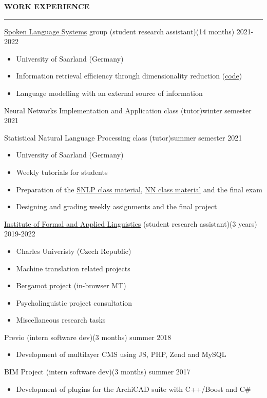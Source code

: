 \documentclass[11pt,a4paper]{article} %
\newcommand{\hSection}[1]{
    \medskip
    \MakeUppercase{\bf #1}
    \medskip
    \hrule
}
\newcommand{\hSubsection}[2]{{#1}\hfill {#2}}
\newcommand{\hSubsectionItemize}[3]{
    {#1}\hfill {\footnotesize #2}\hspace{-1cm}\\
    \vspace{-0.5cm}
    \begin{itemize} \footnotesize #3 \end{itemize}
    \vspace{0.3\baselineskip}
}
\begin{document}
\newpage

\vspace{-0.1cm}
\hSection{Work Experience}
\hSubsectionItemize
{\href{https://www.lsv.uni-saarland.de/}{Spoken Language Systems} group (student research assistant)}
{(14 months) 2021-2022}
{
    \item University of Saarland (Germany)
    \item Information retrieval efficiency through dimensionality reduction (\href{https://github.com/zouharvi/kb-shrink}{code})
    \item Language modelling with an external source of information
}

\hSubsection{Neural Networks Implementation and Application class (tutor)}{\footnotesize winter semester 2021 \hspace{-1.3cm}}
\vspace{-0.2cm}

\hSubsectionItemize
{Statistical Natural Language Processing class (tutor)}
{summer semester 2021}
{
    \item University of Saarland (Germany)
    \item Weekly tutorials for students
    \item Preparation of the \href{https://github.com/zouharvi/uds-snlp-tutorial}{SNLP class material}, \href{https://github.com/zouharvi/uds-nn-tutorial}{NN class material} and the final exam
    \item Designing and grading weekly assignments and the final project
}

\hSubsectionItemize
{\href{https://ufal.mff.cuni.cz}{Institute of Formal and Applied Linguistics} (student research assistant)}
{(3 years) 2019-2022}
{
    \item Charles Univeristy (Czech Republic)
    \item Machine translation related projects
    \item \href{https://browser.mt/}{Bergamot project} (in-browser MT)
    \item Psycholinguistic project consultation
    \item Miscellaneous research tasks
}

\hSubsectionItemize
{Previo (intern software dev)}
{(3 months) summer 2018}
{
    \item Development of multilayer CMS using JS, PHP, Zend and MySQL
}

\hSubsectionItemize
{BIM Project (intern software dev)}
{(3 months) summer 2017}
{
    \item Development of plugins for the ArchiCAD suite with C++/Boost and C\#
}
\end{document}
